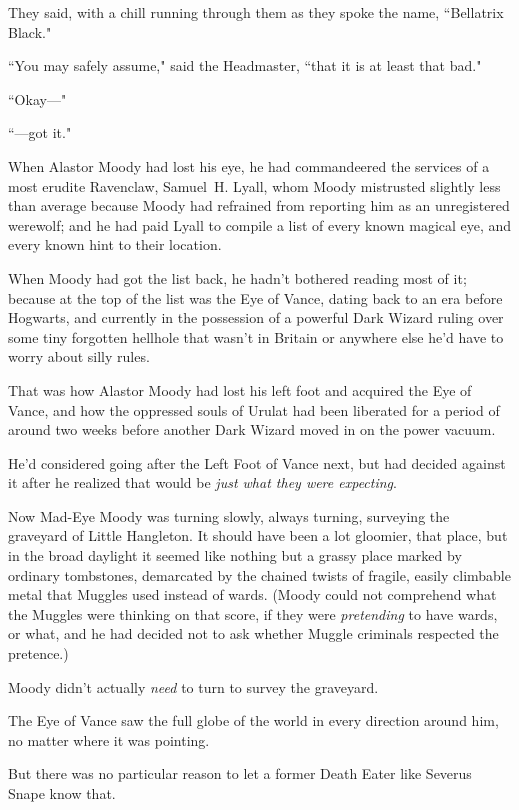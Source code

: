 They said, with a chill running through them as they spoke the name, ``Bellatrix Black."

``You may safely assume," said the Headmaster, ``that it is at least that bad."

``Okay—"

``—got it."


When Alastor Moody had lost his eye, he had commandeered the services of a most erudite Ravenclaw, Samuel~H. Lyall, whom Moody mistrusted slightly less than average because Moody had refrained from reporting him as an unregistered werewolf; and he had paid Lyall to compile a list of every known magical eye, and every known hint to their location.

When Moody had got the list back, he hadn't bothered reading most of it; because at the top of the list was the Eye of Vance, dating back to an era before Hogwarts, and currently in the possession of a powerful Dark Wizard ruling over some tiny forgotten hellhole that wasn't in Britain or anywhere else he'd have to worry about silly rules.

That was how Alastor Moody had lost his left foot and acquired the Eye of Vance, and how the oppressed souls of Urulat had been liberated for a period of around two weeks before another Dark Wizard moved in on the power vacuum.

He'd considered going after the Left Foot of Vance next, but had decided against it after he realized that would be \emph{just what they were expecting}.

Now Mad-Eye Moody was turning slowly, always turning, surveying the graveyard of Little Hangleton. It should have been a lot gloomier, that place, but in the broad daylight it seemed like nothing but a grassy place marked by ordinary tombstones, demarcated by the chained twists of fragile, easily climbable metal that Muggles used instead of wards. (Moody could not comprehend what the Muggles were thinking on that score, if they were \emph{pretending} to have wards, or what, and he had decided not to ask whether Muggle criminals respected the pretence.)

Moody didn't actually \emph{need} to turn to survey the graveyard.

The Eye of Vance saw the full globe of the world in every direction around him, no matter where it was pointing.

But there was no particular reason to let a former Death Eater like Severus Snape know that.

